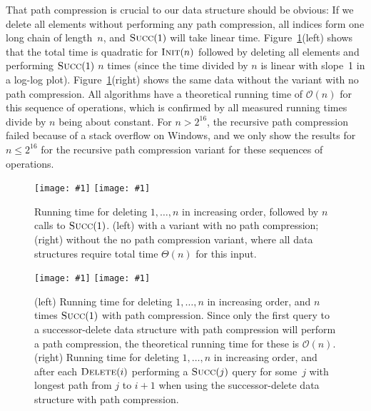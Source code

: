\documentclass[a4paper]{lipics-v2021}
\newcommand{\Oh}{\mathcal{O}}
\newcommand{\plot}[1]{\texttt{[image: \#1]}}
\newcommand{\FuncName}[1]{\textup{\textsc{#1}}}
\newcommand{\Init}{\FuncName{Init}}
\newcommand{\Delete}{\FuncName{Delete}}
\newcommand{\Succ}{\FuncName{Succ}}
\begin{document}
That path compression is crucial to our data structure should be obvious: If we delete all elements without performing any path compression, all indices form one long chain of length~$n$, and $\Succ(1)$ will take linear time. Figure~\ref{fig:plot-query-1}(left) shows that the total time is quadratic for $\Init(n)$ followed by deleting all elements and performing $\Succ(1)$ $n$ times (since the time divided by $n$ is linear with slope~1 in a log-log plot). Figure~\ref{fig:plot-query-1}(right) shows the same data without the variant with no path compression. All algorithms have a theoretical running time of $\Oh(n)$ for this sequence of operations, which is confirmed by all measured running times divide by $n$ being about constant. For $n > 2^{16}$, the recursive path compression failed because of a stack overflow on Windows, and we only show the results for $n \leq 2^{16}$ for the recursive path compression variant for these sequences of operations.

\begin{figure}[!t]
  \plot{naive-logarithmic.pdf} \hfill
  \plot{successor-query-one.pdf}

  \caption{Running time for deleting $1,\ldots,n$ in increasing order, followed by $n$ calls to $\Succ(1)$. (left) with a variant with no path compression; (right) without the no path compression variant, where all data structures require total time $\Theta(n)$ for this input.}
  \label{fig:plot-query-1}
\end{figure}

\begin{figure}[!t]
  \plot{successor-query-worst-case.pdf} \hfill
  \plot{random-deletion-worst-case-query.pdf}

  \caption{(left) Running time for deleting $1,\ldots,n$ in increasing order, and $n$ times $\Succ(1)$ with path compression. Since only the first query to a successor-delete data structure with path compression will perform a path compression, the theoretical running time for these is $\Oh(n)$. (right) Running time for deleting $1,\ldots,n$ in increasing order, and after each $\Delete(i)$ performing a $\Succ(j)$ query for some~$j$ with longest path from $j$ to $i+1$ when using the successor-delete data structure with path compression.}
  \label{fig:plot-summary}
\end{figure}
\end{document}
